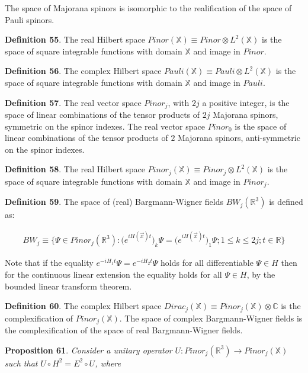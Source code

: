 \documentclass[11pt]{book}
\begin{document}
The space of Majorana spinors is isomorphic to the realification of the
space of Pauli spinors.

\textbf{Definition 55}. The real Hilbert space
\(Pinor(\mathbb{X})\equiv Pinor\otimes L^2(\mathbb{X})\) is the space of
square integrable functions with domain \(\mathbb{X}\) and image in
\(Pinor\).

\textbf{Definition 56}. The complex Hilbert space
\(Pauli(\mathbb{X})\equiv Pauli\otimes L^2(\mathbb{X})\) is the space of
square integrable functions with domain \(\mathbb{X}\) and image in
\(Pauli\).

\textbf{Definition 57}. The real vector space \(Pinor_j\), with \(2j\) a
positive integer, is the space of linear combinations of the tensor
products of \(2j\) Majorana spinors, symmetric on the spinor indexes.
The real vector space \(Pinor_0\) is the space of linear combinations of
the tensor products of \(2\) Majorana spinors, anti-symmetric on the
spinor indexes.

\textbf{Definition 58}. The real Hilbert space
\(Pinor_j(\mathbb{X})\equiv Pinor_j\otimes L^2(\mathbb{X})\) is the
space of square integrable functions with domain \(\mathbb{X}\) and
image in \(Pinor_j\).

\textbf{Definition 59}. The space of (real) Bargmann-Wigner fields
\(BW_{j}(\mathbb{R}^3)\) is defined as:

\begin{equation}\begin{aligned}
BW_j\equiv 
\{\Psi\in Pinor_{j}(\mathbb{R}^3):
\Big(e^{iH(\vec{x}) t}\Big)_k\Psi=\Big(e^{iH(\vec{x})t}\Big)_1 \Psi; 1\leq k\leq
2j; t\in \mathbb{R}\}\end{aligned}\end{equation}

Note that if the equality \(e^{-iH_1 t}\Psi=e^{-iH_2 t}\Psi\) holds for
all differentiable \(\Psi\in H\) then for the continuous linear
extension the equality holds for all \(\Psi\in H\), by the bounded
linear transform theorem.

\textbf{Definition 60}. The complex Hilbert space
\(Dirac_j(\mathbb{X})\equiv Pinor_j(\mathbb{X})\otimes \mathbb{C}\) is
the complexification of \(Pinor_j(\mathbb{X})\). The space of complex
Bargmann-Wigner fields is the complexification of the space of real
Bargmann-Wigner fields.

\textbf{Proposition 61}. \emph{Consider a unitary operator
}\(U:Pinor_j(\mathbb{R}^3)\to Pinor_j(\mathbb{X})\)\emph{ such that
}\(U \circ H^2=E^2 \circ U\)\emph{, where }
\end{document}
